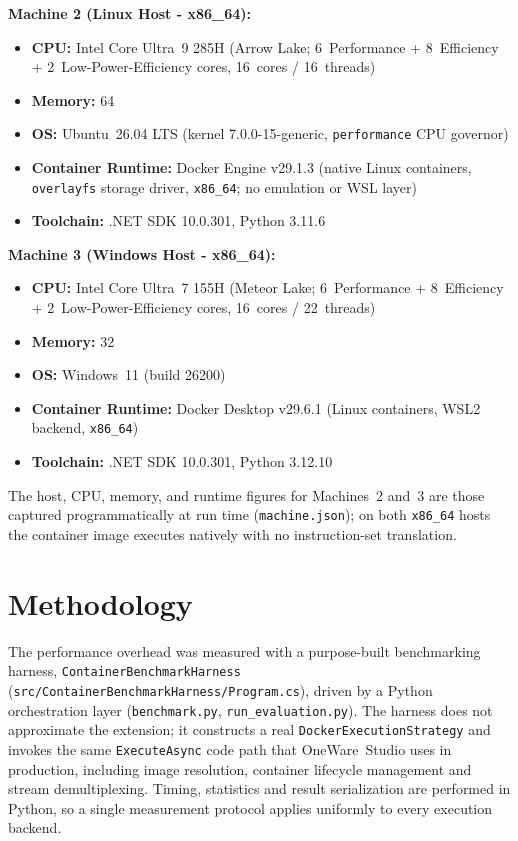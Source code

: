 \textbf{Machine 2 (Linux Host - x86\_64):}
\begin{itemize}
    \item \textbf{CPU:} Intel Core Ultra~9 285H (Arrow Lake; 6~Performance + 8~Efficiency + 2~Low-Power-Efficiency cores, 16~cores / 16~threads)
    \item \textbf{Memory:} \SI{64}{\giga\byte}
    \item \textbf{OS:} Ubuntu~26.04 LTS (kernel 7.0.0-15-generic, \texttt{performance} CPU governor)
    \item \textbf{Container Runtime:} Docker Engine v29.1.3 (native Linux containers, \texttt{overlayfs} storage driver, \texttt{x86\_64}; no emulation or WSL layer)
    \item \textbf{Toolchain:} .NET SDK 10.0.301, Python 3.11.6
\end{itemize}

\textbf{Machine 3 (Windows Host - x86\_64):}
\begin{itemize}
    \item \textbf{CPU:} Intel Core Ultra~7 155H (Meteor Lake; 6~Performance + 8~Efficiency + 2~Low-Power-Efficiency cores, 16~cores / 22~threads)
    \item \textbf{Memory:} \SI{32}{\giga\byte}
    \item \textbf{OS:} Windows~11 (build 26200)
    \item \textbf{Container Runtime:} Docker Desktop v29.6.1 (Linux containers, WSL2 backend, \texttt{x86\_64})
    \item \textbf{Toolchain:} .NET SDK 10.0.301, Python 3.12.10
\end{itemize}
The host, CPU, memory, and runtime figures for Machines~2 and~3 are those captured programmatically at run time (\texttt{machine.json}); on both \texttt{x86\_64} hosts the container image executes natively with no instruction-set translation.

\section{Methodology}
The performance overhead was measured with a purpose-built benchmarking harness, \texttt{Container\-Benchmark\-Harness} (\texttt{src/ContainerBenchmarkHarness/Program.cs}), driven by a Python orchestration layer (\texttt{benchmark.py}, \texttt{run\_evaluation.py}). The harness does not approximate the extension; it constructs a real \texttt{DockerExecutionStrategy} and invokes the same \texttt{ExecuteAsync} code path that OneWare~Studio uses in production, including image resolution, container lifecycle management and stream demultiplexing. Timing, statistics and result serialization are performed in Python, so a single measurement protocol applies uniformly to every execution backend.

